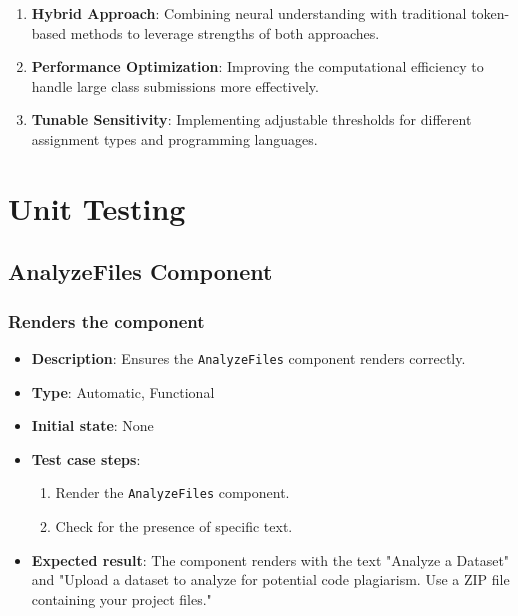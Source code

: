 \documentclass[12pt, titlepage]{article}
\begin{document}
\begin{enumerate}
    \item \textbf{Hybrid Approach}: Combining neural understanding with traditional token-based methods to leverage strengths of both approaches.

    \item \textbf{Performance Optimization}: Improving the computational efficiency to handle large class submissions more effectively.

    \item \textbf{Tunable Sensitivity}: Implementing adjustable thresholds for different assignment types and programming languages.
\end{enumerate}

\section{Unit Testing}
\subsection{AnalyzeFiles Component}

\subsubsection{Renders the component}
\begin{itemize}
    \item \textbf{Description}: Ensures the \texttt{AnalyzeFiles} component renders correctly.
    \item \textbf{Type}: Automatic, Functional
    \item \textbf{Initial state}: None
    \item \textbf{Test case steps}:
    \begin{enumerate}
        \item Render the \texttt{AnalyzeFiles} component.
        \item Check for the presence of specific text.
    \end{enumerate}
    \item \textbf{Expected result}: The component renders with the text "Analyze a Dataset" and "Upload a dataset to analyze for potential code plagiarism. Use a ZIP file containing your project files."
\end{itemize}
\end{document}
